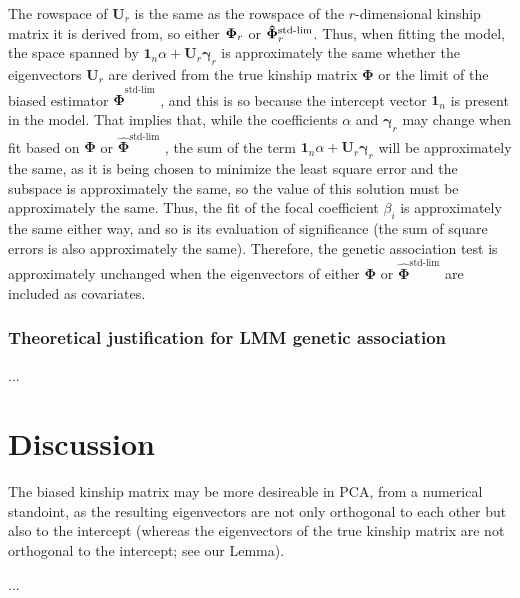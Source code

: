 \documentclass[11pt]{article}
\newcommand{\kinMat}{%
  \ensuremath{%
    \mathbf{\Phi}
  }%
  \xspace%
}%
\newcommand{\kinMatStdLim}{%
  \ensuremath{%
    \mathbf{\hat{\Phi}}^\text{std-lim}
  }%
  \xspace%
}%
\begin{document}
The rowspace of $\mathbf{U}_r$ is the same as the rowspace of the $r$-dimensional kinship matrix it is derived from, so either $\kinMat_r$ or $\kinMatStdLim_r$.
Thus, when fitting the model, the space spanned by $\mathbf{1}_n \alpha + \mathbf{U}_r \mathbf{\gamma}_r$ is approximately the same whether the eigenvectors $\mathbf{U}_r$ are derived from the true kinship matrix \kinMat or the limit of the biased estimator \kinMatStdLim, and this is so because the intercept vector $\mathbf{1}_n$ is present in the model.
That implies that, while the coefficients $\alpha$ and $\mathbf{\gamma}_r$ may change when fit based on \kinMat or \kinMatStdLim, the sum of the term $\mathbf{1}_n \alpha + \mathbf{U}_r \mathbf{\gamma}_r$ will be approximately the same, as it is being chosen to minimize the least square error and the subspace is approximately the same, so the value of this solution must be approximately the same.
Thus, the fit of the focal coefficient $\beta_i$ is approximately the same either way, and so is its evaluation of significance (the sum of square errors is also approximately the same).
Therefore, the genetic association test is approximately unchanged when the eigenvectors of either \kinMat or \kinMatStdLim are included as covariates.

\subsubsection{Theoretical justification for LMM genetic association}

...

\section{Discussion}

The biased kinship matrix may be more desireable in PCA, from a numerical standoint, as the resulting eigenvectors are not only orthogonal to each other but also to the intercept (whereas the eigenvectors of the true kinship matrix are not orthogonal to the intercept; see our Lemma).


...

\printbibliography
\end{document}
